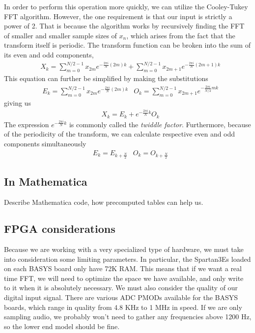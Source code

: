 \documentclass[12pt]{article}
\begin{document}
    In order to perform this operation more quickly, we can utilize the Cooley-Tukey FFT algorithm.
    However, the one requirement is that our input is strictly a power of 2.
    That is because the algorithm works by recursively finding the FFT of smaller and smaller sample sizes of $x_n$, which arises from the fact that the transform itself is periodic.
    The transform function can be broken into the sum of its even and odd components,
    \begin{align*} 
        &X_k = \sum \limits_{m=0}^{N/2-1} x_{2m}e^{-\frac{2\pi i}{N} (2m)k} + \sum \limits_{m=0}^{N/2-1} x_{2m+1} e^{-\frac{2\pi i}{N} (2m+1)k}
    \end{align*}
    This equation can further be simplified by making the substitutions
    \begin{align*}
        &E_k = \sum \limits_{m=0}^{N/2-1} x_{2m}e^{-\frac{2\pi i}{N} (2m)k}
        &O_k = \sum \limits_{m=0}^{N/2-1} x_{2m+1} e^{-\frac{2\pi i}{N/2} mk}
    \end{align*}
    giving us
    \begin{align*}
        &X_k = E_k + e^{-\frac{2\pi i}{N} k} O_k
    \end{align*}
    The expression $e^{-\frac{2\pi i}{N}k}$ is commonly called the \textit{twiddle factor}.
    Furthermore, because of the periodicity of the transform, we can calculate respective even and odd components simultaneously
    \begin{align*}
        &E_k = E_{k+\frac{N}{2}}
        &O_k = O_{k+\frac{N}{2}}
    \end{align*}
    


  \subsection*{In Mathematica}
    Describe Mathematica code, how precomputed tables can help us.
  \subsection*{FPGA considerations}
    Because we are working with a very specialized type of hardware, we must take into consideration some limiting parameters.
    In particular, the Spartan3Es loaded on each BASYS board only have 72K RAM.
    This means that if we want a real time FFT, we will need to optimize the space we have available, and only write to it when it is absolutely necessary.
    We must also consider the quality of our digital input signal.
    There are various ADC PMODs available for the BASYS boards, which range in quality from 4.8 KHz to 1 MHz in speed.
    If we are only sampling audio, we probably won't need to gather any frequencies above 1200 Hz, so the lower end model should be fine.\\
\end{document}

